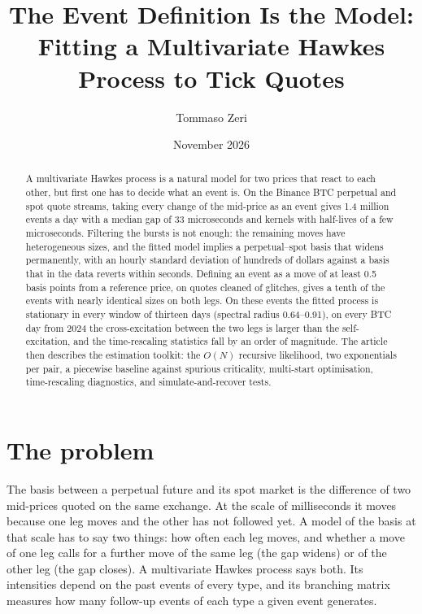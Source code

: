 \documentclass[a4paper,11pt]{article}
\title{The Event Definition Is the Model:\\ Fitting a Multivariate Hawkes Process to Tick Quotes}
\author{Tommaso Zeri}
\date{November 2026}
\begin{document}
\normalsize
\maketitle

\begin{abstract}
\noindent
A multivariate Hawkes process is a natural model for two prices that react to each other, but first one has to decide what an event is. On the Binance BTC perpetual and spot quote streams, taking every change of the mid-price as an event gives 1.4 million events a day with a median gap of 33 microseconds and kernels with half-lives of a few microseconds. Filtering the bursts is not enough: the remaining moves have heterogeneous sizes, and the fitted model implies a perpetual--spot basis that widens permanently, with an hourly standard deviation of hundreds of dollars against a basis that in the data reverts within seconds. Defining an event as a move of at least 0.5 basis points from a reference price, on quotes cleaned of glitches, gives a tenth of the events with nearly identical sizes on both legs. On these events the fitted process is stationary in every window of thirteen days (spectral radius 0.64--0.91), on every BTC day from 2024 the cross-excitation between the two legs is larger than the self-excitation, and the time-rescaling statistics fall by an order of magnitude. The article then describes the estimation toolkit: the $O(N)$ recursive likelihood, two exponentials per pair, a piecewise baseline against spurious criticality, multi-start optimisation, time-rescaling diagnostics, and simulate-and-recover tests.
\end{abstract}

\section{The problem}

The basis between a perpetual future and its spot market is the difference of two mid-prices quoted on the same exchange. At the scale of milliseconds it moves because one leg moves and the other has not followed yet. A model of the basis at that scale has to say two things: how often each leg moves, and whether a move of one leg calls for a further move of the same leg (the gap widens) or of the other leg (the gap closes). A multivariate Hawkes process says both. Its intensities depend on the past events of every type, and its branching matrix measures how many follow-up events of each type a given event generates.
\end{document}
